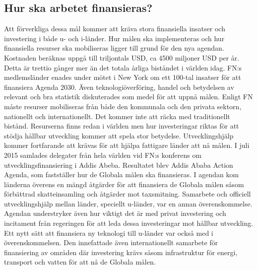 \documentclass{report}
\begin{document}
\subsection{Hur ska arbetet finansieras?} 
Att förverkliga dessa mål kommer att kräva stora finansiella insatser och  investering i både u- och i-länder. \cite{web2030agenda}
Hur målen ska implementeras och hur finansiella resurser ska mobiliseras ligger till grund för den nya agendan. \cite{webUNASweden}
Kostnaden beräknas uppgå till triljontals USD, \cite{web2030agenda} ca 4500 miljoner USD per år. Detta är trettio gånger mer än det totala årliga biståndet i världen idag. \cite{webUNICEF} FN:s medlemsländer enades under mötet i New York om ett 100-tal insatser för att finansiera Agenda 2030. Även teknologiöverföring, handel och betydelsen av relevant och bra statistik diskuterades som medel för att uppnå målen. \cite{webUNASweden}
Enligt FN måste resurser mobiliseras från både den kommunala och den privata sektorn, nationellt och internationellt. Det kommer inte att räcka med traditionellt bistånd. Resurserna finns redan i världen men hur investeringar riktas för att stödja hållbar utveckling kommer att spela stor betydelse. Utvecklingshjälp kommer fortfarande att krävas för att hjälpa fattigare länder att nå målen. 
\cite{web2030agenda}
I juli 2015 samlades delegater från hela världen vid FN:s konferens om utvecklingsfinansiering i Addis Abeba. Resultatet blev Addis Ababa Action Agenda, som fastställer hur de Globala målen ska finansieras. \cite{SIDA}
I agendan kom länderna överens en mängd åtgärder för att finansiera de Globala målen såsom förbättrad skatteinsamling och åtgärder mot taxsmitning. Samarbete och officiell utvecklingshjälp mellan länder, speciellt u-länder, var en annan överenskommelse. Agendan understryker även hur viktigt det är med privat investering och incitament från regeringen för att leda dessa investeringar mot hållbar utveckling. Ett nytt sätt att finansiera ny teknologi till u-länder var också med i överenskommelsen. Den innefattade även internationellt samarbete för finansiering av områden där investering krävs såsom infrastruktur för energi, transport och vatten för att nå de Globala målen.  
\cite{webUNDESA}\\
\end{document}

